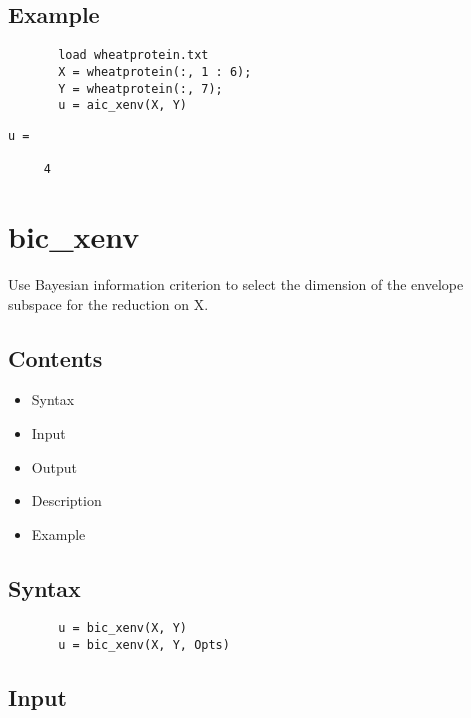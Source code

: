 \documentclass[a4paper,11pt,openany]{memoir}
\begin{document}
\subsection*{Example}


\begin{verbatim}       load wheatprotein.txt
       X = wheatprotein(:, 1 : 6);
       Y = wheatprotein(:, 7);
       u = aic_xenv(X, Y)\end{verbatim}
    
        \color{lightgray}\ttfamily \begin{verbatim}
u =

     4

\end{verbatim} \rmfamily
\color{black}
    
\newpage

\rmfamily
\color{black}\section{bic\_xenv}

\begin{par}
Use Bayesian information criterion to select the dimension of the envelope subspace for the reduction on X.
\end{par} \vspace{1em}

\subsection*{Contents}

\begin{itemize}
\setlength{\itemsep}{-1ex}
   \item Syntax
   \item Input
   \item Output
   \item Description
   \item Example
\end{itemize}


\subsection*{Syntax}


\begin{verbatim}       u = bic_xenv(X, Y)
       u = bic_xenv(X, Y, Opts)\end{verbatim}
    

\subsection*{Input}
\end{document}
